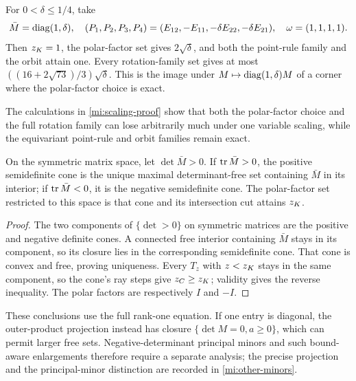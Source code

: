 \begin{proposition}\label{mi:scaling}
For $0<\delta\le1/4$, take
\[
 \bar M=\operatorname{diag}(1,\delta),\quad
 (P_1,P_2,P_3,P_4)=(E_{12},-E_{11},-\delta E_{22},-\delta E_{21}),
 \quad\omega=(1,1,1,1).
\]
Then $z_K=1$, the polar-factor set gives $2\sqrt\delta$, and both the
point-rule family and the orbit attain one. Every rotation-family set gives
at most $((16+2\sqrt{73})/3)\sqrt\delta$.
This is the image under $M\mapsto\operatorname{diag}(1,\delta)M$ of a corner where the
polar-factor choice is exact.
\end{proposition}
\noindent
The calculations in \cref{mi:scaling-proof} show that both the polar-factor
choice and the full rotation family can lose arbitrarily much under one
variable scaling, while the equivariant point-rule and orbit families remain
exact.

\begin{proposition}\label{mi:principal}
On the symmetric matrix space, let $\det\bar M>0$.
If $\operatorname{tr}\bar M>0$, the positive semidefinite cone is the unique maximal
determinant-free set containing $\bar M$ in its interior; if
$\operatorname{tr}\bar M<0$, it is the negative semidefinite cone.
The polar-factor set restricted to this space is that cone and its
intersection cut attains $z_K$.
\end{proposition}
\begin{proof}
The two components of $\{\det>0\}$ on symmetric matrices are the positive
and negative definite cones. A connected free interior containing
$\bar M$ stays in its component, so its closure lies in the corresponding
semidefinite cone. That cone is convex and free, proving uniqueness.
Every $T_z$ with $z<z_K$ stays in the same component, so the cone's ray
steps give $z_C\ge z_K$; validity gives the reverse inequality.
The polar factors are respectively $I$ and $-I$.
\end{proof}

These conclusions use the full rank-one equation. If one entry is diagonal,
the outer-product projection instead has closure
$\{\det M=0,a\ge0\}$, which can permit larger free sets.
Negative-determinant principal minors and such bound-aware enlargements
therefore require a separate analysis; the precise projection and the
principal-minor distinction are recorded in \cref{mi:other-minors}.
